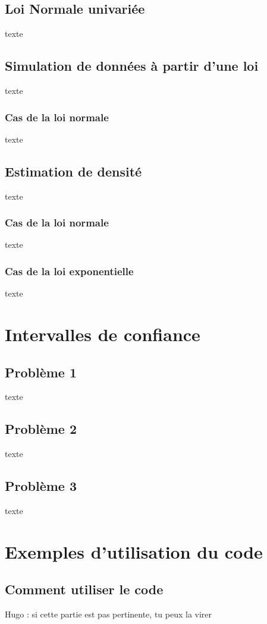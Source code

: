 \documentclass{article}      %
\begin{document}
\subsection{Loi Normale univariée}
texte
\subsection{Simulation de données à partir d’une loi}
texte

\subsubsection{Cas de la loi normale}
texte

\subsection{Estimation de densité}
texte

\subsubsection{Cas de la loi normale}
texte
\subsubsection{Cas de la loi exponentielle}
texte


\section{Intervalles de confiance}
\subsection{Problème 1}
texte
\subsection{Problème 2}
texte
\subsection{Problème 3}
texte



\section{Exemples d'utilisation du code}
\subsection{Comment utiliser le code}
Hugo : si cette partie est pas pertinente, tu peux la virer
\end{document}
